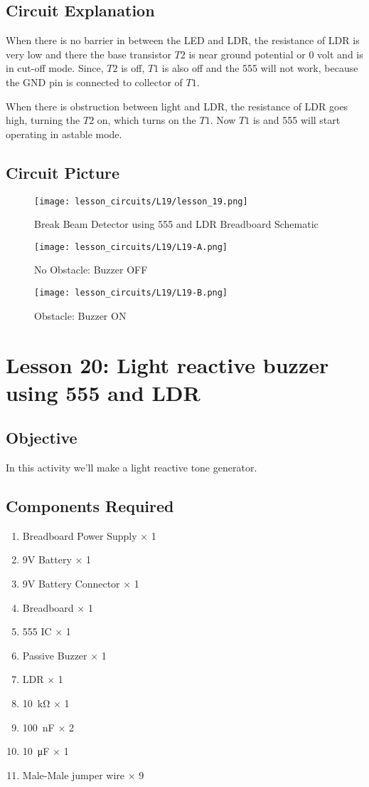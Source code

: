 \subsection{Circuit Explanation}
When there is no barrier in between the LED and LDR, the resistance of LDR is very low and there the base transistor $T2$ is near 
ground potential or 0 volt and is in cut-off mode. Since, $T2$ is off, $T1$ is also off and the 555 will not work, because the GND 
pin is connected to collector of $T1$.

When there is obstruction between light and LDR, the resistance of LDR goes high, turning the $T2$ on, which turns on the $T1$. 
Now $T1$ is and 555 will start operating in astable mode.
\subsection{Circuit Picture}
\begin{figure}[!htp]
    \centering
    \texttt{[image: lesson\_circuits/L19/lesson\_19.png]}
    \caption{Break Beam Detector using 555 and LDR Breadboard Schematic}
    \label{fig:555_bbdet_sch}
\end{figure}
\begin{figure}[!htp]
    \centering
    \texttt{[image: lesson\_circuits/L19/L19-A.png]}
    \caption{No Obstacle: Buzzer OFF}
    \label{fig:555_bbdet_obb}
\end{figure}
\begin{figure}[!htp]
    \centering
    \texttt{[image: lesson\_circuits/L19/L19-B.png]}
    \caption{Obstacle: Buzzer ON}
    \label{fig:555_bbdet_obb1}
\end{figure}
\clearpage
\section{Lesson 20: Light reactive buzzer using 555 and LDR}
\subsection{Objective}
In this activity we'll make a light reactive tone generator.
\subsection{Components Required}
\begin{enumerate}
    \item Breadboard Power Supply $\times$ 1
    \item 9V Battery $\times$ 1
    \item 9V Battery Connector $\times$ 1
    \item Breadboard $\times$ 1
    \item 555 IC $\times$ 1
    \item Passive Buzzer $\times$ 1
    \item LDR $\times$ 1
    \item \SI{10}{\kilo\ohm} $\times$ 1
    \item \SI{100}{\nano\farad} $\times$ 2
    \item \SI{10}{\micro\farad} $\times$ 1
    \item Male-Male jumper wire $\times$ 9
\end{enumerate}
